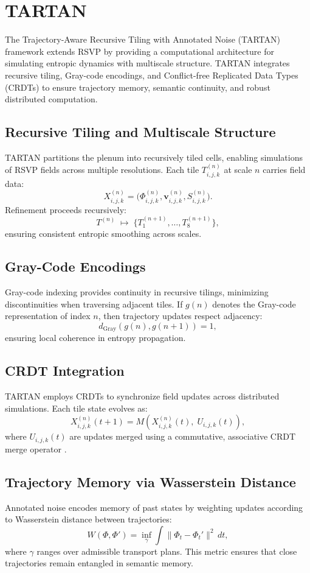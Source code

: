 \documentclass[12pt]{report}
\begin{document}
\chapter{TARTAN}
\label{app:T}
The Trajectory-Aware Recursive Tiling with Annotated Noise (TARTAN) framework extends RSVP by providing a computational architecture for simulating entropic dynamics with multiscale structure. TARTAN integrates recursive tiling, Gray-code encodings, and Conflict-free Replicated Data Types (CRDTs) to ensure trajectory memory, semantic continuity, and robust distributed computation.

\section{Recursive Tiling and Multiscale Structure}
TARTAN partitions the plenum into recursively tiled cells, enabling simulations of RSVP fields across multiple resolutions. Each tile \(T_{i,j,k}^{(n)}\) at scale \(n\) carries field data:
\[
X^{(n)}_{i,j,k} = \big(\Phi^{(n)}_{i,j,k}, \mathbf{v}^{(n)}_{i,j,k}, S^{(n)}_{i,j,k}\big).
\]
Refinement proceeds recursively:
\[
T^{(n)} \;\mapsto\; \{ T^{(n+1)}_1, \dots, T^{(n+1)}_8 \},
\]
ensuring consistent entropic smoothing across scales.

\section{Gray-Code Encodings}
Gray-code indexing provides continuity in recursive tilings, minimizing discontinuities when traversing adjacent tiles. If \(g(n)\) denotes the Gray-code representation of index \(n\), then trajectory updates respect adjacency:
\[
d_{\text{Gray}}(g(n), g(n+1)) = 1,
\]
ensuring local coherence in entropy propagation.

\section{CRDT Integration}
TARTAN employs CRDTs to synchronize field updates across distributed simulations. Each tile state evolves as:
\[
X^{(n)}_{i,j,k}(t+1) = M\left(X^{(n)}_{i,j,k}(t), \; U_{i,j,k}(t)\right),
\]
where \(U_{i,j,k}(t)\) are updates merged using a commutative, associative CRDT merge operator \citep{Shapiro2011}.

\section{Trajectory Memory via Wasserstein Distance}
Annotated noise encodes memory of past states by weighting updates according to Wasserstein distance between trajectories:
\begin{equation}
W(\Phi, \Phi') = \inf_{\gamma} \int \|\Phi_t - \Phi_t'\|^2 \, dt, \label{eq:wasserstein}
\end{equation}
where \(\gamma\) ranges over admissible transport plans. This metric ensures that close trajectories remain entangled in semantic memory.
\end{document}
